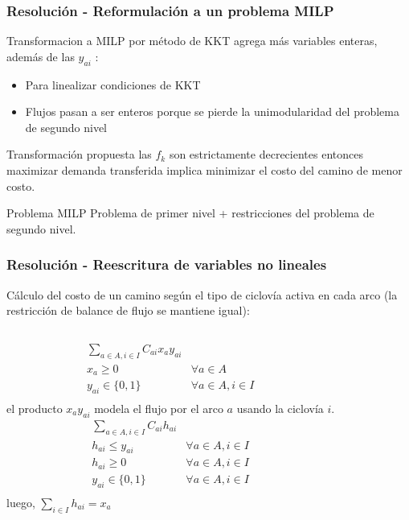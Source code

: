\documentclass[aspectratio=43, 10pt]{beamer}
\begin{document}
\begin{frame}
    \frametitle{Resolución - Reformulación a un problema MILP}

    Transformacion a MILP por método de KKT agrega más variables enteras, además de las $y_{ai}$ \parencite{kara2004}:
    \begin{itemize}
    \item{Para linealizar condiciones de KKT}
    \item{Flujos pasan a ser enteros porque se pierde la unimodularidad del problema de segundo nivel}
    \end{itemize}

    \vspace{10pt}

    \begin{block}{Transformación propuesta}
        las $f_k$ son estrictamente decrecientes entonces maximizar demanda transferida implica minimizar el costo del camino de menor costo.
    \end{block}
    \vspace{10pt}

    \begin{block}{Problema MILP}
        Problema de primer nivel + restricciones del problema de segundo nivel.
    \end{block}
\end{frame}

\begin{frame}
    \frametitle{Resolución - Reescritura de variables no lineales}
    Cálculo del costo de un camino según el tipo de ciclovía activa en cada arco (la restricción de balance de flujo se mantiene igual):

    \begin{columns}[c]
            \begin{eqnarray*}
              \sum_{a \in A, i \in I} C_{ai} x_a y_{ai} \\
              x_a \geq 0 & \forall a \in A \\
              y_{ai} \in \{0,1\} & \forall a \in A, i \in I \\
            \end{eqnarray*}
            el producto $x_a y_{ai}$ modela el flujo por el arco $a$ usando la
            ciclovía $i$.
            \begin{eqnarray*}
              \sum_{a \in A, i \in I} C_{ai} h_{ai} & \\
              h_{ai} \leq y_{ai} & \forall a \in A, i \in I \\
              h_{ai} \geq 0 & \forall a \in A, i \in I \\
              y_{ai} \in \{0,1\} & \forall a \in A, i \in I \\
            \end{eqnarray*}
            luego, $\sum_{i \in I} h_{ai} = x_{a}$
    \end{columns}
\end{frame}
\end{document}
